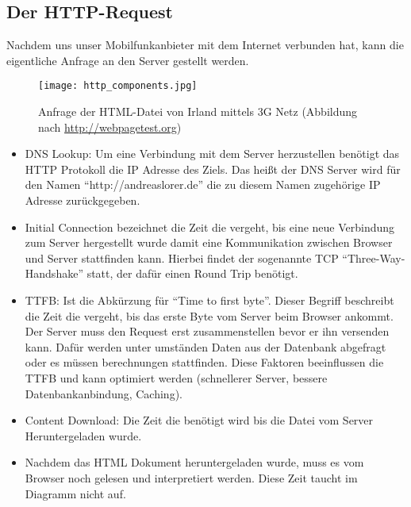 

		\subsection{Der HTTP-Request} %
		\label{sub:der_http_request_komponente}
			Nachdem uns unser Mobilfunkanbieter mit dem Internet verbunden hat, kann die eigentliche Anfrage an den Server gestellt werden.

			\begin{figure}[htbp]
				\begin{center}
					\texttt{[image: http\_components.jpg]}
					\caption{Anfrage der HTML-Datei von Irland mittels 3G Netz (Abbildung nach \url{http://webpagetest.org})}
					\label{fig:http_components}
				\end{center}
			\end{figure}

			\begin{itemize}
				\item DNS Lookup: Um eine Verbindung mit dem Server herzustellen benötigt das HTTP Protokoll die IP Adresse des Ziels. Das heißt der DNS Server wird für den Namen "`http://andreaslorer.de"' die zu diesem Namen zugehörige IP Adresse zurückgegeben.

				\item Initial Connection bezeichnet die Zeit die vergeht, bis eine neue Verbindung zum Server hergestellt wurde damit eine Kommunikation zwischen Browser und Server stattfinden kann. Hierbei findet der sogenannte TCP "`Three-Way-Handshake"' statt, der dafür einen Round Trip benötigt.

				\item TTFB: Ist die Abkürzung für "`Time to first byte"'. Dieser Begriff beschreibt die Zeit die vergeht, bis das erste Byte vom Server beim Browser ankommt. Der Server muss den Request erst zusammenstellen bevor er ihn versenden kann. Dafür werden unter umständen Daten aus der Datenbank abgefragt oder es müssen berechnungen stattfinden. Diese Faktoren beeinflussen die TTFB und kann optimiert werden (schnellerer Server, bessere Datenbankanbindung, Caching).

				\item Content Download: Die Zeit die benötigt wird bis die Datei vom Server Heruntergeladen wurde.

				\item Nachdem das HTML Dokument heruntergeladen wurde, muss es vom Browser noch gelesen und interpretiert werden. Diese Zeit taucht im Diagramm nicht auf.
			\end{itemize}
					
